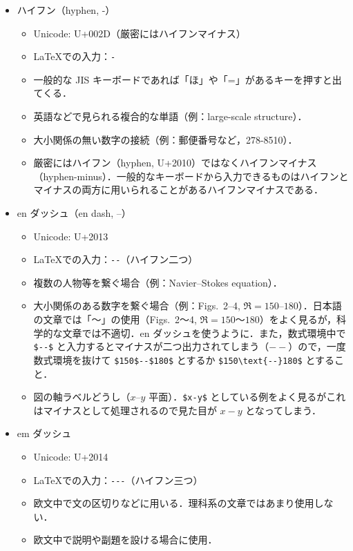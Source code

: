 \begin{itemize}
    \item ハイフン（hyphen, -）
    \begin{itemize}
        \item Unicode: U+002D（厳密にはハイフンマイナス）
        \item \LaTeX での入力：\verb|-|
        \item 一般的な JIS キーボードであれば「ほ」や「=」があるキーを押すと出てくる．
        \item 英語などで見られる複合的な単語（例：large-scale structure）．
        \item 大小関係の無い数字の接続（例：郵便番号など，278-8510）．
        \item 厳密にはハイフン（hyphen, U+2010）ではなくハイフンマイナス（hyphen-minus）．一般的なキーボードから入力できるものはハイフンとマイナスの両方に用いられることがあるハイフンマイナスである．
    \end{itemize}
    \item en ダッシュ（en dash, --）
    \begin{itemize}
        \item Unicode: U+2013
        \item \LaTeX での入力：\verb|--|（ハイフン二つ）
        \item 複数の人物等を繋ぐ場合（例：Navier--Stokes equation）．
        \item 大小関係のある数字を繋ぐ場合（例：Figs.~2--4, $\Re = 150$--$180$）．日本語の文章では「～」の使用（Figs.~2～4, $\Re = 150$～$180$）をよく見るが，科学的な文章では不適切．en ダッシュを使うように．また，数式環境中で \verb|$--$| と入力するとマイナスが二つ出力されてしまう（$--$）ので，一度数式環境を抜けて \verb|$150$--$180$| とするか \verb|$150\text{--}180$| とすること．
        \item 図の軸ラベルどうし（$x$--$y$ 平面）．\verb|$x-y$| としている例をよく見るがこれはマイナスとして処理されるので見た目が $x-y$ となってしまう．
    \end{itemize}
    \item em ダッシュ
    \begin{itemize}
        \item Unicode: U+2014
        \item \LaTeX での入力：\verb|---|（ハイフン三つ）
        \item 欧文中で文の区切りなどに用いる．理科系の文章ではあまり使用しない．
        \item 欧文中で説明や副題を設ける場合に使用．

\end{itemize}
\end{itemize}
